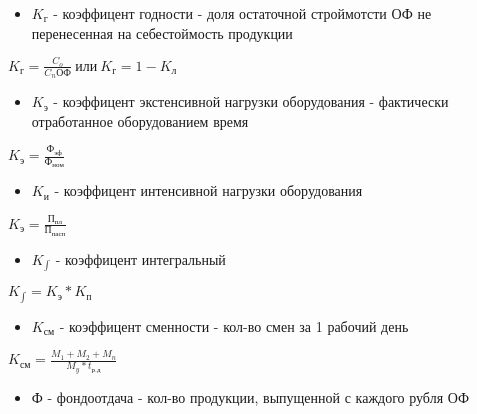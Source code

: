 \documentclass[11pt]{article}
\begin{document}
\begin{itemize}
\item \(K_\text{г}\) - коэффицент годности - доля остаточной строймотсти ОФ не перенесенная на себестоймость продукции
\end{itemize}


\begin{math}
 K_{\text{г}} = \frac{C_{o}}{C_{n}\text{ОФ}} \  \text{или} \   K_{\text{г}} = 1 - K_{\text{л}}
\end{math}

\begin{itemize}
\item \(K_\text{э}\) - коэффицент экстенсивной нагрузки оборудования - фактически отработанное оборудованием время
\end{itemize}

\begin{math}
  K_{\text{э}} = \frac{\text{Ф}_{\text{эф}}}{\text{Ф}_{\text{ном}}}
\end{math}


\begin{itemize}
\item \(K_\text{и}\) - коэффицент интенсивной нагрузки оборудования
\end{itemize}

\begin{math}
  K_{\text{э}} = \frac{\text{П}_{\text{пл}}}{\text{П}_{\text{пасп}}}
\end{math}


\begin{itemize}
\item \(K_{\int}\) - коэффицент интегральный
\end{itemize}

\begin{math}
  K_{\int} = K_{\text{э}} * K_{\text{п}}
\end{math}


\begin{itemize}
\item \(K_{\text{см}}\) - коэффицент сменности - кол-во смен за 1 рабочий день
\end{itemize}

\begin{math}
K_{\text{см}} = \frac{M_{1}+M_{2}+M_{n}}{M_{y}*t_{\text{р.д}}}
\end{math}


\begin{itemize}
\item Ф - фондоотдача - кол-во продукции, выпущенной с каждого рубля ОФ
\end{itemize}
\end{document}
